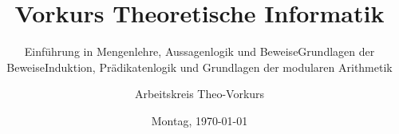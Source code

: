 %
%
%
%



\title{Vorkurs Theoretische Informatik}

\if{}
    \subtitle{Einführung in Mengenlehre, Aussagenlogik und Beweise}
    \newcommand\daynamestr{Montag}
\fi
\if{}
    \subtitle{Grundlagen der Beweise}
    \newcommand\daynamestr{Dienstag}
    \AdvanceDate
\fi
\if{}
    \subtitle{Induktion, Prädikatenlogik und Grundlagen der modularen Arithmetik}
    \newcommand\daynamestr{Mittwoch}
    \AdvanceDate\AdvanceDate
\fi


\date{\daynamestr, \today}

\author{Arbeitskreis Theo-Vorkurs}

